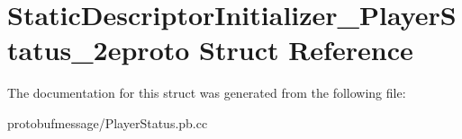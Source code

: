 \hypertarget{struct_static_descriptor_initializer___player_status__2eproto}{\section{Static\-Descriptor\-Initializer\-\_\-\-Player\-Status\-\_\-2eproto Struct Reference}
\label{struct_static_descriptor_initializer___player_status__2eproto}
}


The documentation for this struct was generated from the following file\-:\begin{DoxyCompactItemize}
\item 
protobufmessage/Player\-Status.\-pb.\-cc\end{DoxyCompactItemize}
